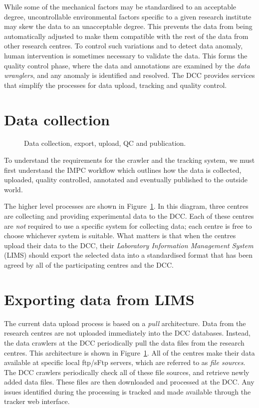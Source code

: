 \documentclass[a4paper,11pt]{article}
\begin{document}
While some of the mechanical factors may be standardised to an acceptable degree, uncontrollable environmental factors specific to a given research institute may skew the data to an unacceptable degree. This prevents the data from being automatically adjusted to make them compatible with the rest of the data from other research centres. To control such variations and to detect data anomaly, human intervention is sometimes necessary to validate the data. This forms the quality control phase, where the data and annotations are examined by the {\sl data wranglers}, and any anomaly is identified and resolved. The DCC provides services that simplify the processes for data upload, tracking and quality control.

\section{Data collection}

\begin{figure}[htbp]
\centering
{}
\caption{Data collection, export, upload, QC and publication.\label{fig:pull architecture}}
\end{figure}

To understand the requirements for the crawler and the tracking system, we must first understand the IMPC workflow which outlines how the data is collected, uploaded, quality controlled, annotated and eventually published to the outside world.

The higher level processes are shown in Figure~\ref{fig:pull architecture}. In this diagram, three centres are collecting and providing experimental data to the DCC. Each of these centres are {\sl not} required to use a specific system for collecting data; each centre is free to choose whichever system is suitable. What matters is that when the centres upload their data to the DCC, their {\sl Laboratory Information Management System} (LIMS) should export the selected data into a standardised format that has been agreed by all of the participating centres and the DCC.

\section{Exporting data from LIMS}

The current data upload process is based on a {\sl pull} architecture. Data from the research centres are not uploaded immediately into the DCC databases. Instead, the data crawlers at the DCC periodically pull the data files from the research centres. This architecture is shown in Figure~\ref{fig:pull architecture}. All of the centres make their data available at specific local ftp/sFtp servers, which are referred to as {\sl file sources}. The DCC crawlers periodically check all of these file sources, and retrieve newly added data files. These files are then downloaded and processed at the DCC. Any issues identified during the processing is tracked and made available through the tracker web interface.
\end{document}
